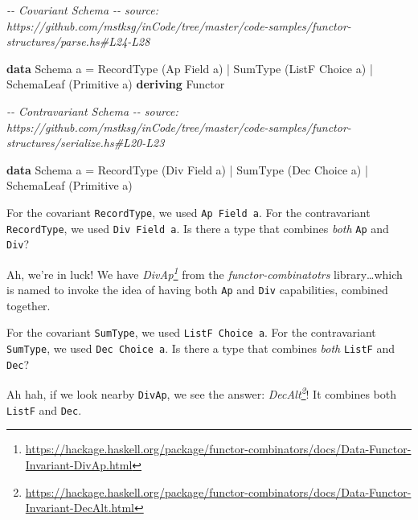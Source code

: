 \documentclass[]{article}
\newenvironment{Shaded}{}{}
\newcommand{\CommentTok}[1]{\textcolor[rgb]{0.38,0.63,0.69}{\textit{#1}}}
\newcommand{\DataTypeTok}[1]{\textcolor[rgb]{0.56,0.13,0.00}{#1}}
\newcommand{\KeywordTok}[1]{\textcolor[rgb]{0.00,0.44,0.13}{\textbf{#1}}}
\newcommand{\NormalTok}[1]{#1}
\newcommand{\OperatorTok}[1]{\textcolor[rgb]{0.40,0.40,0.40}{#1}}
\newcommand{\OtherTok}[1]{\textcolor[rgb]{0.00,0.44,0.13}{#1}}
\renewcommand{\href}[2]{#2\footnote{\url{#1}}}
\begin{document}
\begin{Shaded}
\begin{Highlighting}[]
\CommentTok{{-}{-} Covariant Schema}
\CommentTok{{-}{-} source: https://github.com/mstksg/inCode/tree/master/code{-}samples/functor{-}structures/parse.hs\#L24{-}L28}

\KeywordTok{data} \DataTypeTok{Schema}\NormalTok{ a }\OtherTok{=}
      \DataTypeTok{RecordType}\NormalTok{  (}\DataTypeTok{Ap} \DataTypeTok{Field}\NormalTok{ a)}
    \OperatorTok{|} \DataTypeTok{SumType}\NormalTok{     (}\DataTypeTok{ListF} \DataTypeTok{Choice}\NormalTok{ a)}
    \OperatorTok{|} \DataTypeTok{SchemaLeaf}\NormalTok{  (}\DataTypeTok{Primitive}\NormalTok{ a)}
  \KeywordTok{deriving} \DataTypeTok{Functor}

\CommentTok{{-}{-} Contravariant Schema}
\CommentTok{{-}{-} source: https://github.com/mstksg/inCode/tree/master/code{-}samples/functor{-}structures/serialize.hs\#L20{-}L23}

\KeywordTok{data} \DataTypeTok{Schema}\NormalTok{ a }\OtherTok{=}
      \DataTypeTok{RecordType}\NormalTok{  (}\DataTypeTok{Div} \DataTypeTok{Field}\NormalTok{ a)}
    \OperatorTok{|} \DataTypeTok{SumType}\NormalTok{     (}\DataTypeTok{Dec} \DataTypeTok{Choice}\NormalTok{ a)}
    \OperatorTok{|} \DataTypeTok{SchemaLeaf}\NormalTok{  (}\DataTypeTok{Primitive}\NormalTok{ a)}
\end{Highlighting}
\end{Shaded}

For the covariant \texttt{RecordType}, we used \texttt{Ap\ Field\ a}. For the
contravariant \texttt{RecordType}, we used \texttt{Div\ Field\ a}. Is there a
type that combines \emph{both} \texttt{Ap} and \texttt{Div}?

Ah, we're in luck! We have
\emph{\href{https://hackage.haskell.org/package/functor-combinators/docs/Data-Functor-Invariant-DivAp.html}{DivAp}}
from the \emph{functor-combinatotrs} library\ldots which is named to invoke the
idea of having both \texttt{Ap} and \texttt{Div} capabilities, combined
together.

For the covariant \texttt{SumType}, we used \texttt{ListF\ Choice\ a}. For the
contravariant \texttt{SumType}, we used \texttt{Dec\ Choice\ a}. Is there a type
that combines \emph{both} \texttt{ListF} and \texttt{Dec}?

Ah hah, if we look nearby \texttt{DivAp}, we see the answer:
\emph{\href{https://hackage.haskell.org/package/functor-combinators/docs/Data-Functor-Invariant-DecAlt.html}{DecAlt}}!
It combines both \texttt{ListF} and \texttt{Dec}.
\end{document}
